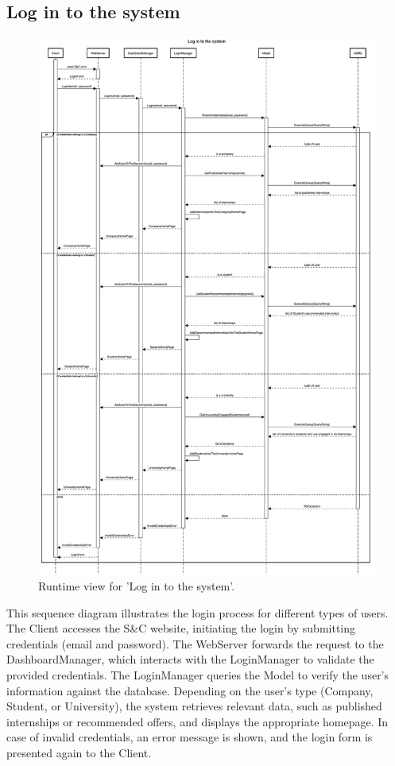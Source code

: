 \subsection{Log in to the system}
\begin{figure}[H]
    \begin{center}
        \includegraphics[width=0.75\linewidth]{DD/LaTeX/Images/RuntimeView/LogIn.png}
        \caption{Runtime view for 'Log in to the system'.}
        \label{fig:runtime_LogIn}%
    \end{center}
\end{figure}

This sequence diagram illustrates the login process for different types of users. The Client accesses the S\&C website, initiating the login by submitting credentials (email and password). The WebServer forwards the request to the DashboardManager, which interacts with the LoginManager to validate the provided credentials. The LoginManager queries the Model to verify the user's information against the database. Depending on the user's type (Company, Student, or University), the system retrieves relevant data, such as published internships or recommended offers, and displays the appropriate homepage. In case of invalid credentials, an error message is shown, and the login form is presented again to the Client.

